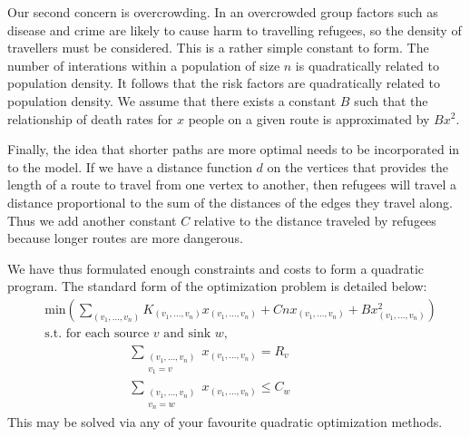 \documentclass{article}
\begin{document}
Our second concern is overcrowding. In an overcrowded group factors such as disease and crime are likely to cause harm to travelling refugees, so the density of travellers must be considered. This is a rather simple constant to form. The number of interations within a population of size $n$ is quadratically related to population density. It follows that the risk factors are quadratically related to population density. We assume that there exists a constant $B$ such that the relationship of death rates for $x$ people on a given route is approximated by $Bx^2$. 

Finally, the idea that shorter paths are more optimal needs to be incorporated in to the model. If we have a distance function $d$ on the vertices that provides the length of a route to travel from one vertex to another, then refugees will travel a distance proportional to the sum of the distances of the edges they travel along. Thus we add another constant $C$ relative to the distance traveled by refugees because longer routes are more dangerous.

We have thus formulated enough constraints and costs to form a quadratic program.  The standard form of the optimization problem is detailed below:
%
\begin{align*}
    &\text{min} \left( \sum_{(v_1, \dots, v_n)} K_{(v_1, \dots, v_n)} x_{(v_1, \dots, v_n)} + Cn x_{(v_1, \dots, v_n)} + B x_{(v_1, \dots, v_n)}^2 \right)\\
    &\text{s.t. for each source $v$ and sink $w$,}\\
    &\ \ \ \ \ \ \ \ \ \ \ \ \ \ \ \ \ \ \ \ \ \ \ \ \ \ \ \ \ \ \sum_{\substack{(v_1, \dots, v_n) \\ v_1 = v}} x_{(v_1, \dots, v_n)} = R_v\\
    &\ \ \ \ \ \ \ \ \ \ \ \ \ \ \ \ \ \ \ \ \ \ \ \ \ \ \ \ \ \ \sum_{\substack{(v_1, \dots, v_n) \\ v_n = w}} x_{(v_1, \dots, v_n)} \leq C_w
\end{align*}
%
This may be solved via any of your favourite quadratic optimization methods.
\end{document}

